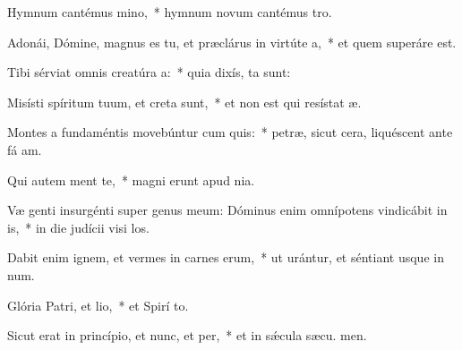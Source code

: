 \item Hymnum cantémus mino,~* hymnum novum cantémus  tro.
\item Adonái, Dómine, magnus es tu, et præclárus in virtúte a,~* et quem superáre  est.
\item Tibi sérviat omnis creatúra a:~* quia dixís,  ta sunt:
\item Misísti spíritum tuum, et creta sunt,~* et non est qui resístat  æ.
\item Montes a fundaméntis movebúntur cum quis:~* petræ, sicut cera, liquéscent ante fá am.
\item Qui autem ment te,~* magni erunt apud   nia.
\item Væ genti insurgénti super genus meum: Dóminus enim omnípotens vindicábit in is,~* in die judícii visi los.
\item Dabit enim ignem, et vermes in carnes erum,~* ut urántur, et séntiant usque in num.
\item Glória Patri, et lio,~* et Spirí to.
\item Sicut erat in princípio, et nunc, et per,~* et in sǽcula sæcu. men.
